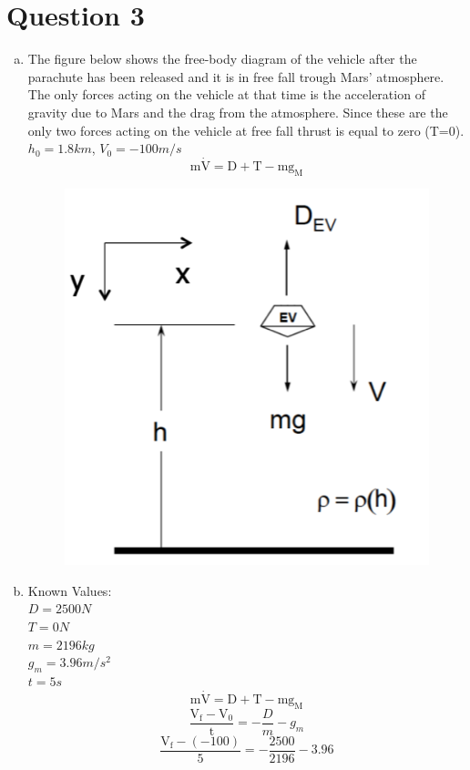 \section{Question 3}\label{sec:q3}    
\begin{enumerate}[a.]
\item
The figure below shows the free-body diagram of the vehicle after the parachute has been released and it is in free fall trough Mars' atmosphere. The only forces acting on the vehicle at that time is the acceleration of gravity due to  Mars and the drag from the atmosphere. Since these are the only two forces acting on the vehicle at free fall thrust is equal to zero (T=0). $h_0 = 1.8 km$, $V_0=-100 m/s$
\begin{equation}
\mathrm{m} \dot{\mathrm{V}}=\mathrm{D}+\mathrm{T}-\mathrm{mg_M}
\end{equation}

\begin{figure}[H]
\centering
\includegraphics[scale=0.75]{FreeBodyDiagram.png} 
\end{figure}


\item
Known Values:\\
$D=2500N$\\
$T=0N$\\
$m=2196kg$\\
$g_m=3.96m/s^2$\\
$t = 5s$\\
\begin{equation}
\mathrm{m} \dot{\mathrm{V}}=\mathrm{D}+\mathrm{T}-\mathrm{mg_M}
\end{equation}
\begin{equation}
\frac{\mathrm{V}_{\mathrm{f}}-\mathrm{V}_{\mathrm{0}}}{\mathrm{t}}=-\frac{D}{m} - g_m
\end{equation}
\begin{equation}
\frac{\mathrm{V}_{\mathrm{f}}-(-100)}{\mathrm{5}}=-\frac{2500}{2196} - 3.96
\end{equation}


\end{enumerate}
